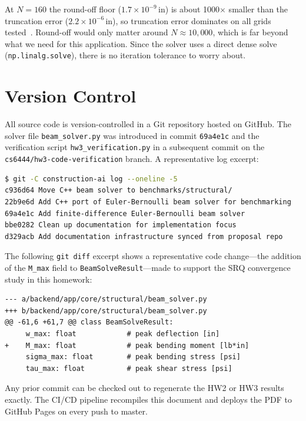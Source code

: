 \documentclass[12pt, letterpaper]{article}
\begin{document}
At $N=160$ the round-off floor ($1.7\times10^{-9}$\,in) is about 1000$\times$
smaller than the truncation error ($2.2\times10^{-6}$\,in), so truncation error
dominates on all grids tested~\cite{roache1998}.
Round-off would only matter around $N \approx 10{,}000$, which is far beyond
what we need for this application.
Since the solver uses a direct dense solve (\texttt{np.linalg.solve}), there is
no iteration tolerance to worry about.

\section{Version Control}

All source code is version-controlled in a Git repository hosted on GitHub.
The solver file \texttt{beam\_solver.py} was introduced in commit \texttt{69a4e1c}
and the verification script \texttt{hw3\_verification.py} in a subsequent commit
on the \texttt{cs6444/hw3-code-verification} branch.
A representative log excerpt:

\begin{lstlisting}[language=bash]
$ git -C construction-ai log --oneline -5
c936d64 Move C++ beam solver to benchmarks/structural/
22b9e6d Add C++ port of Euler-Bernoulli beam solver for benchmarking
69a4e1c Add finite-difference Euler-Bernoulli beam solver
bbe0282 Clean up documentation for implementation focus
d329acb Add documentation infrastructure synced from proposal repo
\end{lstlisting}

The following \texttt{git diff} excerpt shows a representative code change---the
addition of the \texttt{M\_max} field to \texttt{BeamSolveResult}---made to
support the SRQ convergence study in this homework:

\begin{lstlisting}
--- a/backend/app/core/structural/beam_solver.py
+++ b/backend/app/core/structural/beam_solver.py
@@ -61,6 +61,7 @@ class BeamSolveResult:
     w_max: float            # peak deflection [in]
+    M_max: float            # peak bending moment [lb*in]
     sigma_max: float        # peak bending stress [psi]
     tau_max: float          # peak shear stress [psi]
\end{lstlisting}

Any prior commit can be checked out to regenerate the HW2 or HW3 results
exactly.
The CI/CD pipeline recompiles this document and deploys the PDF to GitHub Pages
on every push to master.
\end{document}
